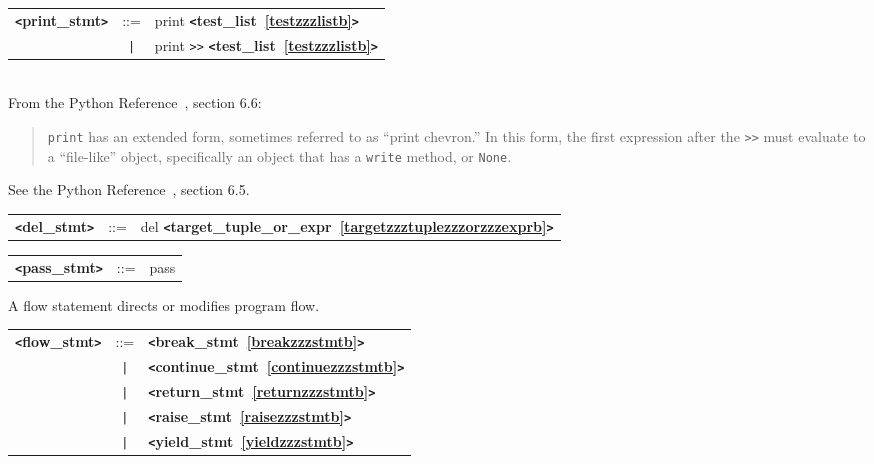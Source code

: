 \label{printzzzstmtb}
\begin{tabular}{lcl}
{\bf \verb+<+print\_stmt\verb+>+} & ::=  & print {\bf \verb+<+test\_list~\ref{testzzzlistb}\verb+>+}  \\
 & \verb+|+  & print \verb|>>| {\bf \verb+<+test\_list~\ref{testzzzlistb}\verb+>+}  \\
\end{tabular} \\

From the Python Reference~\cite{pythonlang}, section 6.6:
\begin{quote}
\verb|print| has an extended form, sometimes referred to as ``print chevron.'' 
In this form, the first expression after the \verb+>>+ must evaluate to a ``file-like'' 
object, specifically an object that has a \verb|write| method, or \verb|None|.
\end{quote}

\label{delzzzstmtb}
See the Python Reference~\cite{pythonlang}, section 6.5.

\begin{tabular}{lcl}
{\bf \verb+<+del\_stmt\verb+>+} & ::=  & del {\bf \verb+<+target\_tuple\_or\_expr~\ref{targetzzztuplezzzorzzzexprb}\verb+>+}  \\
\end{tabular}

\label{passzzzstmtb}
\begin{tabular}{lcl}
{\bf \verb+<+pass\_stmt\verb+>+} & ::=  & pass \\
\end{tabular}

\label{flowzzzstmtb}
A flow statement directs or modifies program flow. \\

\begin{tabular}{lcl}
{\bf \verb+<+flow\_stmt\verb+>+} & ::=  & {\bf \verb+<+break\_stmt~\ref{breakzzzstmtb}\verb+>+}  \\
 & \verb+|+  & {\bf \verb+<+continue\_stmt~\ref{continuezzzstmtb}\verb+>+}  \\
 & \verb+|+  & {\bf \verb+<+return\_stmt~\ref{returnzzzstmtb}\verb+>+}  \\
 & \verb+|+  & {\bf \verb+<+raise\_stmt~\ref{raisezzzstmtb}\verb+>+}  \\
 & \verb+|+  & {\bf \verb+<+yield\_stmt~\ref{yieldzzzstmtb}\verb+>+}  \\
\end{tabular}

